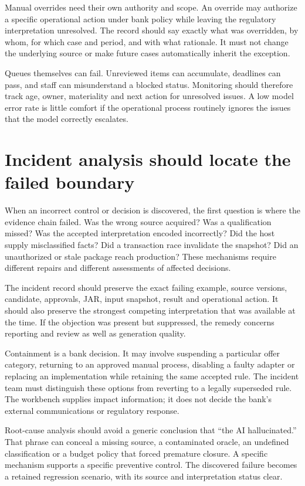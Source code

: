\documentclass[12pt,a4paper,oneside,openany]{book}
\begin{document}
Manual overrides need their own authority and scope. An override may authorize a
specific operational action under bank policy while leaving the regulatory
interpretation unresolved. The record should say exactly what was overridden,
by whom, for which case and period, and with what rationale. It must not change
the underlying source or make future cases automatically inherit the exception.

Queues themselves can fail. Unreviewed items can accumulate, deadlines can pass,
and staff can misunderstand a blocked status. Monitoring should therefore track
age, owner, materiality and next action for unresolved issues. A low model error
rate is little comfort if the operational process routinely ignores the issues
that the model correctly escalates.

\section{Incident analysis should locate the failed boundary}

When an incorrect control or decision is discovered, the first question is where
the evidence chain failed. Was the wrong source acquired? Was a qualification
missed? Was the accepted interpretation encoded incorrectly? Did the host supply
misclassified facts? Did a transaction race invalidate the snapshot? Did an
unauthorized or stale package reach production? These mechanisms require different
repairs and different assessments of affected decisions.

The incident record should preserve the exact failing example, source versions,
candidate, approvals, JAR, input snapshot, result and operational action. It
should also preserve the strongest competing interpretation that was available
at the time. If the objection was present but suppressed, the remedy concerns
reporting and review as well as generation quality.

Containment is a bank decision. It may involve suspending a particular offer
category, returning to an approved manual process, disabling a faulty adapter or
replacing an implementation while retaining the same accepted rule. The incident
team must distinguish these options from reverting to a legally superseded rule.
The workbench supplies impact information; it does not decide the bank's external
communications or regulatory response.

Root-cause analysis should avoid a generic conclusion that ``the AI hallucinated.''
That phrase can conceal a missing source, a contaminated oracle, an undefined
classification or a budget policy that forced premature closure. A specific
mechanism supports a specific preventive control. The discovered failure becomes
a retained regression scenario, with its source and interpretation status clear.
\end{document}
